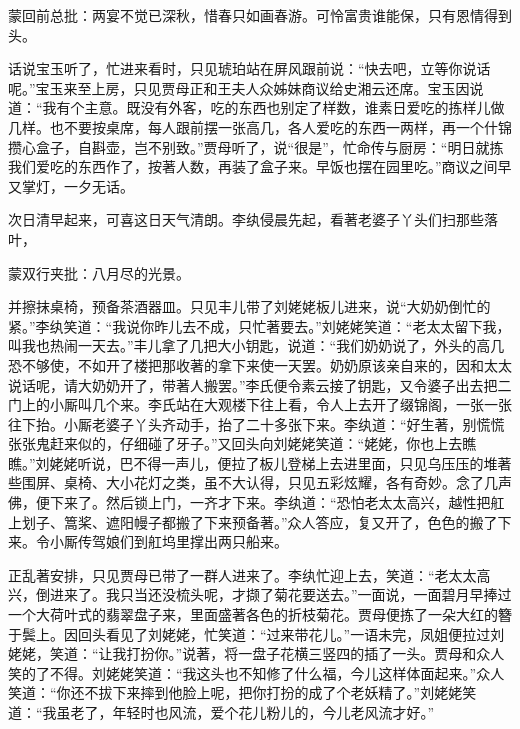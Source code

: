 \begin{parag}
    \begin{note}蒙回前总批：两宴不觉已深秋，惜春只如画春游。可怜富贵谁能保，只有恩情得到头。\end{note}
\end{parag}


\begin{parag}
    话说宝玉听了，忙进来看时，只见琥珀站在屏风跟前说：“快去吧，立等你说话呢。”宝玉来至上房，只见贾母正和王夫人众姊妹商议给史湘云还席。宝玉因说道：“我有个主意。既没有外客，吃的东西也别定了样数，谁素日爱吃的拣样儿做几样。也不要按桌席，每人跟前摆一张高几，各人爱吃的东西一两样，再一个什锦攒心盒子，自斟壶，岂不别致。”贾母听了，说“很是”，忙命传与厨房：“明日就拣我们爱吃的东西作了，按著人数，再装了盒子来。早饭也摆在园里吃。”商议之间早又掌灯，一夕无话。
\end{parag}


\begin{parag}
    次日清早起来，可喜这日天气清朗。李纨侵晨先起，看著老婆子丫头们扫那些落叶，\begin{note}蒙双行夹批：八月尽的光景。\end{note}并擦抹桌椅，预备茶酒器皿。只见丰儿带了刘姥姥板儿进来，说“大奶奶倒忙的紧。”李纨笑道：“我说你昨儿去不成，只忙著要去。”刘姥姥笑道：“老太太留下我，叫我也热闹一天去。”丰儿拿了几把大小钥匙，说道：“我们奶奶说了，外头的高几恐不够使，不如开了楼把那收著的拿下来使一天罢。奶奶原该亲自来的，因和太太说话呢，请大奶奶开了，带著人搬罢。”李氏便令素云接了钥匙，又令婆子出去把二门上的小厮叫几个来。李氏站在大观楼下往上看，令人上去开了缀锦阁，一张一张往下抬。小厮老婆子丫头齐动手，抬了二十多张下来。李纨道：“好生著，别慌慌张张鬼赶来似的，仔细碰了牙子。”又回头向刘姥姥笑道：“姥姥，你也上去瞧瞧。”刘姥姥听说，巴不得一声儿，便拉了板儿登梯上去进里面，只见乌压压的堆著些围屏、桌椅、大小花灯之类，虽不大认得，只见五彩炫耀，各有奇妙。念了几声佛，便下来了。然后锁上门，一齐才下来。李纨道：“恐怕老太太高兴，越性把舡上划子、篙桨、遮阳幔子都搬了下来预备著。”众人答应，复又开了，色色的搬了下来。令小厮传驾娘们到舡坞里撑出两只船来。
\end{parag}


\begin{parag}
    正乱著安排，只见贾母已带了一群人进来了。李纨忙迎上去，笑道：“老太太高兴，倒进来了。我只当还没梳头呢，才撷了菊花要送去。”一面说，一面碧月早捧过一个大荷叶式的翡翠盘子来，里面盛著各色的折枝菊花。贾母便拣了一朵大红的簪于鬓上。因回头看见了刘姥姥，忙笑道：“过来带花儿。”一语未完，凤姐便拉过刘姥姥，笑道：“让我打扮你。”说著，将一盘子花横三竖四的插了一头。贾母和众人笑的了不得。刘姥姥笑道：“我这头也不知修了什么福，今儿这样体面起来。”众人笑道：“你还不拔下来摔到他脸上呢，把你打扮的成了个老妖精了。”刘姥姥笑道：“我虽老了，年轻时也风流，爱个花儿粉儿的，今儿老风流才好。”
\end{parag}


